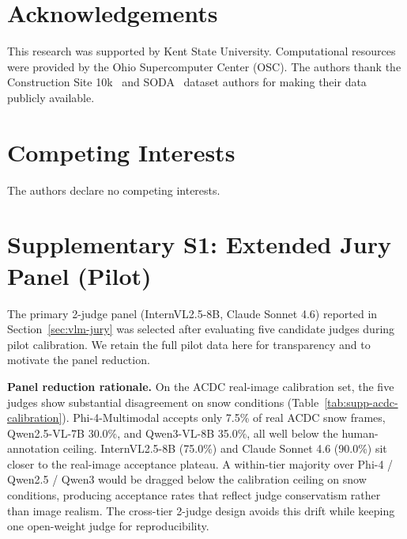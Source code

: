 \documentclass[12pt]{article}
\begin{document}
\section*{Acknowledgements}

This research was supported by Kent State University. Computational resources were provided by the Ohio Supercomputer Center (OSC). The authors thank the Construction Site 10k~\citep{chen2025vlm} and SODA~\citep{duan2022soda} dataset authors for making their data publicly available.


\section*{Competing Interests}

The authors declare no competing interests.


\section*{Supplementary S1: Extended Jury Panel (Pilot)}
\label{sec:supp-jury-pilot}

The primary 2-judge panel (InternVL2.5-8B, Claude Sonnet 4.6) reported in Section~\ref{sec:vlm-jury} was selected after evaluating five candidate judges during pilot calibration. We retain the full pilot data here for transparency and to motivate the panel reduction.

\textbf{Panel reduction rationale.} On the ACDC real-image calibration set, the five judges show substantial disagreement on snow conditions (Table~\ref{tab:supp-acdc-calibration}). Phi-4-Multimodal accepts only 7.5\% of real ACDC snow frames, Qwen2.5-VL-7B 30.0\%, and Qwen3-VL-8B 35.0\%, all well below the human-annotation ceiling. InternVL2.5-8B (75.0\%) and Claude Sonnet 4.6 (90.0\%) sit closer to the real-image acceptance plateau. A within-tier majority over Phi-4 / Qwen2.5 / Qwen3 would be dragged below the calibration ceiling on snow conditions, producing acceptance rates that reflect judge conservatism rather than image realism. The cross-tier 2-judge design avoids this drift while keeping one open-weight judge for reproducibility.
\end{document}
